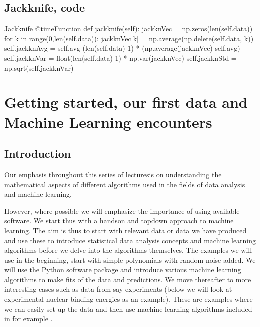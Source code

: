\documentclass[letterpaper,10pt,english]{sphinxmanual}
\begin{document}
\subsection{Jackknife, code}
\label{\detokenize{chapter2:jackknife-code}}
\begin{sphinxVerbatim}[commandchars=\\\{\}]
    \PYGZsh{} Jackknife
        @timeFunction
        def jackknife(self):
            jackknVec = np.zeros(len(self.data))
            for k in range(0,len(self.data)):
                jackknVec[k] = np.average(np.delete(self.data, k))
            self.jackknAvg = self.avg \PYGZhy{} (len(self.data) \PYGZhy{} 1) * (np.average(jackknVec) \PYGZhy{} self.avg)
            self.jackknVar = float(len(self.data) \PYGZhy{} 1) * np.var(jackknVec)
            self.jackknStd = np.sqrt(self.jackknVar)
\end{sphinxVerbatim}


\section{Getting started, our first data and Machine Learning encounters}
\label{\detokenize{chapter3:getting-started-our-first-data-and-machine-learning-encounters}}\label{\detokenize{chapter3::doc}}

\subsection{Introduction}
\label{\detokenize{chapter3:introduction}}
Our emphasis throughout this series of lecturesis on understanding the mathematical aspects of
different algorithms used in the fields of data analysis and machine learning.

However, where possible we will emphasize the
importance of using available software. We start thus with a hands\sphinxhyphen{}on
and top\sphinxhyphen{}down approach to machine learning. The aim is thus to start with
relevant data or data we have produced
and use these to introduce statistical data analysis
concepts and machine learning algorithms before we delve into the
algorithms themselves. The examples we will use in the beginning, start with simple
polynomials with random noise added. We will use the Python
software package  and
introduce various machine learning algorithms to make fits of
the data and predictions. We move thereafter to more interesting
cases such as data from say experiments (below we will look at experimental nuclear binding energies as an example).
These are examples where we can easily set up the data and
then use machine learning algorithms included in for example
.
\end{document}
